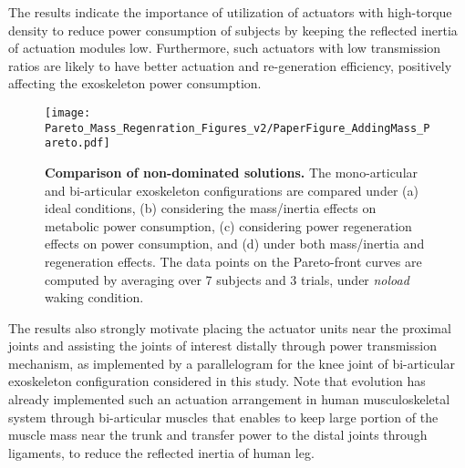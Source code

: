 \documentclass[10pt,letterpaper]{article}
\begin{document}
The results indicate the importance of utilization of actuators with high-torque density to reduce power consumption of subjects by keeping the reflected inertia of actuation modules low. Furthermore, such actuators with low transmission ratios are likely to have better actuation and re-generation efficiency, positively affecting the exoskeleton power consumption.

\begin{figure*}[ht]
	\centering
	\texttt{[image: Pareto\_Mass\_Regenration\_Figures\_v2/PaperFigure\_AddingMass\_Pareto.pdf]}
	\vspace{-3mm}
	\caption{{\small\textbf{Comparison of non-dominated solutions.} The mono-articular and bi-articular exoskeleton configurations are compared under (a) ideal conditions, (b) considering the mass/inertia effects on metabolic power consumption, (c) considering power regeneration effects on power consumption, and (d) under both mass/inertia and regeneration effects. The data points on the Pareto-front curves are computed by averaging over 7 subjects and 3 trials, under \emph{noload} waking condition.}}
	\label{Fig_Paretofronts_Mass_Regeneration_Effect}
\end{figure*}

The results also strongly motivate placing the actuator units near the proximal joints and assisting the joints of interest distally through power transmission mechanism, as implemented by a parallelogram for the knee joint of bi-articular exoskeleton configuration considered in this study. Note that evolution has already implemented such an actuation arrangement in human musculoskeletal system through bi-articular muscles that enables to keep large portion of the muscle mass near the trunk and transfer power to the distal joints through ligaments, to reduce the reflected inertia of human leg. %


\end{document}
